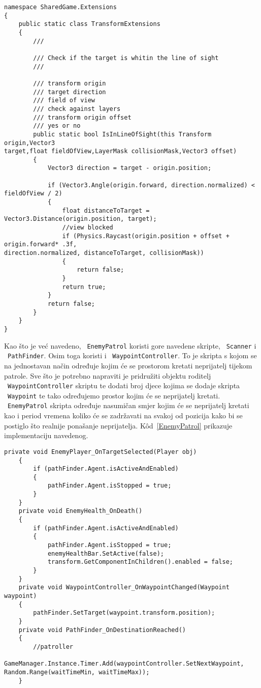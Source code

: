 \begin{lstlisting}[caption={Proširivanje klasa}, label=TransformExtension]
namespace SharedGame.Extensions
{
    public static class TransformExtensions
    {
        /// 

        /// Check if the target is whitin the line of sight
        /// 

        /// transform origin
        /// target direction
        /// field of view
        /// check against layers
        /// transform origin offset
        /// yes or no
        public static bool IsInLineOfSight(this Transform origin,Vector3
target,float fieldOfView,LayerMask collisionMask,Vector3 offset)
        {
            Vector3 direction = target - origin.position;

            if (Vector3.Angle(origin.forward, direction.normalized) < fieldOfView / 2)
            {
                float distanceToTarget = Vector3.Distance(origin.position, target);
                //view blocked
                if (Physics.Raycast(origin.position + offset + origin.forward* .3f,
direction.normalized, distanceToTarget, collisionMask))
                {
                    return false;
                }
                return true;
            }
            return false;
        }
    }
}
\end{lstlisting}

Kao što je već navedeno, ~\texttt{EnemyPatrol} koristi gore navedene skripte, ~\texttt{Scanner} i
~\texttt{PathFinder}. Osim toga koristi i ~\texttt{WaypointController}. To je skripta s kojom se na
jednostavan način određuje kojim će se prostorom kretati neprijatelj tijekom
patrole. Sve što je potrebno napraviti je pridružiti objektu roditelj
~\texttt{WaypointController} skriptu te dodati broj djece kojima se dodaje skripta ~\texttt{Waypoint} te
tako određujemo prostor kojim će se neprijatelj kretati. ~\texttt{EnemyPatrol} skripta
određuje nasumičan smjer kojim će se neprijatelj kretati kao i period vremena koliko
će se zadržavati na svakoj od pozicija kako bi se postiglo što realnije ponašanje
neprijatelja. K\^od~\ref{EnemyPatrol} prikazuje implementaciju navedenog.
\begin{lstlisting}[caption={Patroliranje neprijatelja}, label=EnemyPatrol]
private void EnemyPlayer_OnTargetSelected(Player obj)
    {
        if (pathFinder.Agent.isActiveAndEnabled)
        {
            pathFinder.Agent.isStopped = true;
        }
    }
    private void EnemyHealth_OnDeath()
    {
        if (pathFinder.Agent.isActiveAndEnabled)
        {
            pathFinder.Agent.isStopped = true;
            enemyHealthBar.SetActive(false);
            transform.GetComponentInChildren().enabled = false;
        }
    }
    private void WaypointController_OnWaypointChanged(Waypoint waypoint)
    {
        pathFinder.SetTarget(waypoint.transform.position);
    }
    private void PathFinder_OnDestinationReached()
    {
        //patroller
        GameManager.Instance.Timer.Add(waypointController.SetNextWaypoint,
Random.Range(waitTimeMin, waitTimeMax));
    }
\end{lstlisting}

